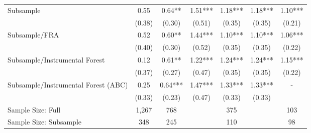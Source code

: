 \begin{tabular}{lcccccc}
Subsample & 0.55 & 0.64** & 1.51*** & 1.18*** & 1.18*** & 1.10*** \\
 & (0.38) & (0.30) & (0.51) & (0.35) & (0.35) & (0.21) \\
Subsample/FRA & 0.52 & 0.60** & 1.44*** & 1.10*** & 1.10*** & 1.06*** \\
 & (0.40) & (0.30) & (0.52) & (0.35) & (0.35) & (0.22) \\
Subsample/Instrumental Forest & 0.12 & 0.61** & 1.22*** & 1.24*** & 1.24*** & 1.15*** \\
 & (0.37) & (0.27) & (0.47) & (0.35) & (0.35) & (0.22) \\
Subsample/Instrumental Forest (ABC) & 0.25 & 0.64*** & 1.47*** & 1.33*** & 1.33*** & - \\
 & (0.33) & (0.23) & (0.47) & (0.33) & (0.33) \\
\midrule 
\midrule 
Sample Size: Full & 1,267 & 768 & \multicolumn{3}{c}{375} & 103 \\
Sample Size: Subsample & 348 & 245 & \multicolumn{3}{c}{110} & 98 \\
\midrule 
\bottomrule 
\end{tabular}
